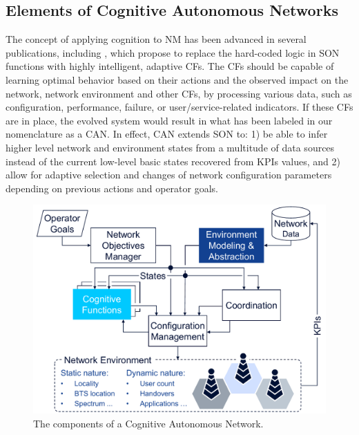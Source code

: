 		\subsection{Elements of Cognitive Autonomous Networks}
			
			The concept of applying cognition to \ac{NM} has been advanced in several publications, including \cite{can_q_learning, can_challenges}, which propose to replace the hard-coded logic in \ac{SON} functions with highly intelligent, adaptive \acp{CF}. 
			The \acp{CF} should be capable of learning optimal behavior based on their actions and the observed impact on the network, network environment and other \acp{CF}, by processing various data, such as configuration, performance, failure, or user/service-related indicators.			
			If these \acp{CF} are in place, the evolved system would result in what has been labeled in our nomenclature as a \ac{CAN}.
			In effect, \ac{CAN} extends \ac{SON} to: 1) be able to infer higher level network and environment states from a multitude of data sources instead of the current low-level basic states recovered from \acp{KPI} values, and 2) allow for adaptive selection and changes of network configuration parameters depending on previous actions and operator goals.
			
			\begin{figure}[ht]
				\centering
				\includegraphics[width=0.8\linewidth]{figures/04_ema/can_overview/can_overview.pdf}
				\caption[CAN components]{The components of a Cognitive Autonomous Network.}
				\label{fig:can_overview}
			\end{figure}
		

